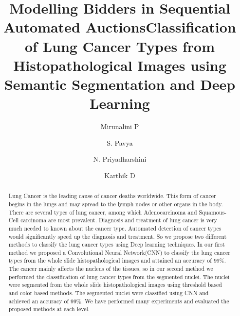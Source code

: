 \documentclass{comjnl}
\begin{document}
\title[Modelling Bidders in Sequential Automated Auctions]{Modelling Bidders in Sequential Automated Auctions}

\author{Mirunalini P}

\author{S. Pavya}

\author{N. Priyadharshini}

\author{Karthik D}

\title{Classification of Lung Cancer Types from Histopathological Images using Semantic Segmentation and Deep Learning}

\maketitle

\begin{abstract}
Lung Cancer is the leading cause of cancer deaths worldwide. This form of cancer begins in the lungs and may spread to the lymph nodes or other organs in the body. There are several types of lung cancer, among which Adenocarcinoma and Squamous-Cell carcinoma are most prevalent. Diagnosis and treatment of lung cancer is very much needed to known about the cancer type. Automated detection of cancer types would significantly speed up the diagnosis and treatment. So we propose two different methods to classify the lung cancer types using Deep learning techniques. In our first method we proposed a Convolutional Neural Network(CNN) to classify the lung cancer types from the whole slide histopathological images and attained an accuracy of 99\%. The cancer mainly affects the nucleus of the tissues, so in our second method we performed the classification of lung cancer types from the segmented nuclei. The nuclei were segmented from the whole slide histopathological images using threshold based and color based methods. The segmented nuclei were classified using CNN and achieved an accuracy of 99\%. We have performed many experiments and evaluated the proposed methods at each level.
\end{abstract}
\end{document}
